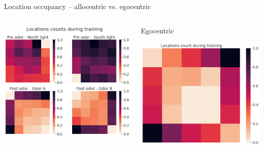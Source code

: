 \documentclass[bigger]{beamer}
\begin{document}
\begin{frame}[label={sec:org2c2a3a1}]{Location occupancy -- allocentric vs. egocentric}
\begin{columns}
\begin{column}{0.5\columnwidth}
\begin{center}
\includegraphics[width=.9\linewidth]{img/q-learning_allo_locations_count_all_steps_by_cues.png}
\end{center}
\end{column}
\begin{column}{0.5\columnwidth}
\footnotesize
\center
\vspace{-1em}
Egocentric
\vspace{-1em}
\begin{center}
\includegraphics[height=0.2\textheight]{img/q-learning_ego_locations_count_all_steps_all_cues.png}
\end{center}


\end{column}
\end{columns}
\end{frame}
\end{document}
